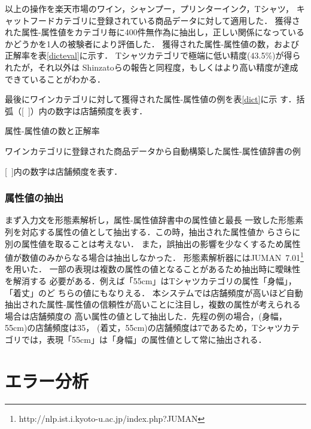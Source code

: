 \documentclass[japanese]{jnlp_1.4}
\begin{document}
\vspace{1\Cvs}
\noindent
以上の操作を楽天市場のワイン，シャンプー，プリンターインク，Tシャツ，
キャットフードカテゴリに登録されている商品データに対して適用した．
獲得された属性-属性値をカテゴリ毎に400件無作為に抽出し，正しい関係になっているかどうかを1人の被験者により評価した．
獲得された属性-属性値の数，および正解率を表\ref{dicteval}に示す．
Tシャツカテゴリで極端に低い精度(43.5\%)が得られたが，それ以外は
Shinzatoらの報告と同程度，もしくはより高い精度が達成できていることがわかる．

最後にワインカテゴリに対して獲得された属性-属性値の例を表\ref{dict}に示
す．括弧（[~]）内の数字は店舗頻度を表す．

\begin{table}[b]
\caption{属性-属性値の数と正解率}
\label{dicteval}

\end{table}
\begin{table}[b]
\caption{ワインカテゴリに登録された商品データから自動構築した属性-属性値辞書の例}
\label{dict}

\par\vspace{4pt}\small
[~]内の数字は店舗頻度を表す．
\end{table}


\subsubsection{属性値の抽出}

まず入力文を形態素解析し，属性-属性値辞書中の属性値と最長
一致した形態素列を対応する属性の値として抽出する．この時，抽出された属性値か
らさらに別の属性値を取ることは考えない．
また，誤抽出の影響を少なくするため属性値が数値のみからなる場合は抽出しなかった．
形態素解析器にはJUMAN~7.01\footnote{http://nlp.ist.i.kyoto-u.ac.jp/index.php?JUMAN}を用いた．
一部の表現は複数の属性の値となることがあるため抽出時に曖昧性を解消する
必要がある．例えば「55cm」はTシャツカテゴリの属性「身幅」，「着丈」のど
ちらの値にもなりえる．
本システムでは店舗頻度が高いほど自動抽出された属性-属性値の信頼性が高いことに注目し，複数の属性が考えられる場合は店舗頻度の
高い属性の値として抽出した．先程の例の場合，(身幅，55cm)の店舗頻度は35，
(着丈，55cm)の店舗頻度は7であるため，Tシャツカテゴリでは，表現「55cm」は「身幅」の属性値として常に抽出される．



\section{エラー分析}
\end{document}
